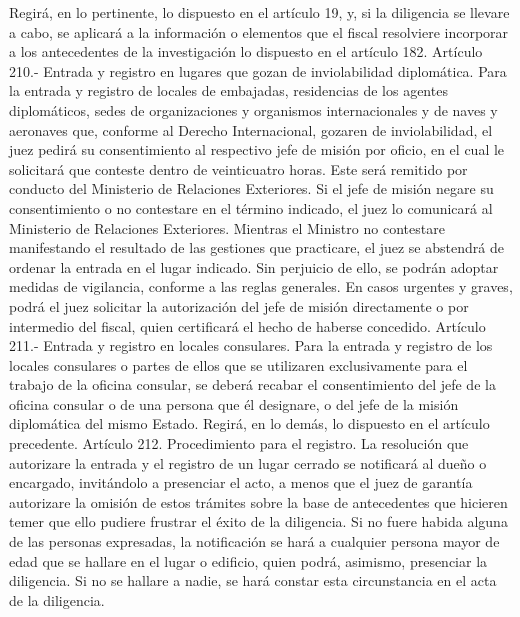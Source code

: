     Regirá, en lo pertinente, lo dispuesto en el artículo 19, y, si la diligencia se llevare a cabo, se aplicará a la información o elementos que el fiscal resolviere incorporar a los antecedentes de la investigación lo dispuesto en el artículo 182.
    Artículo 210.- Entrada y registro en lugares que gozan de inviolabilidad diplomática. Para la entrada y registro de locales de embajadas, residencias de los agentes diplomáticos, sedes de organizaciones y organismos internacionales y de naves y aeronaves que, conforme al Derecho Internacional, gozaren de inviolabilidad, el juez pedirá su consentimiento al respectivo jefe de misión por oficio, en el cual le solicitará que conteste dentro de veinticuatro horas. Este será remitido por conducto del Ministerio de Relaciones Exteriores.
    Si el jefe de misión negare su consentimiento o no contestare en el término indicado, el juez lo comunicará al Ministerio de Relaciones Exteriores. Mientras el Ministro no contestare manifestando el resultado de las gestiones que practicare, el juez se abstendrá de ordenar la entrada en el lugar indicado. Sin perjuicio de ello, se podrán adoptar medidas de vigilancia, conforme a las reglas generales.
    En casos urgentes y graves, podrá el juez solicitar la autorización del jefe de misión directamente o por intermedio del fiscal, quien certificará el hecho de haberse concedido.
    Artículo 211.- Entrada y registro en locales consulares. Para la entrada y registro de los locales consulares o partes de ellos que se utilizaren exclusivamente para el trabajo de la oficina consular, se deberá recabar el consentimiento del jefe de la oficina consular o de una persona que él designare, o del jefe de la misión diplomática del mismo Estado.
    Regirá, en lo demás, lo dispuesto en el artículo precedente.
    Artículo 212. Procedimiento para el registro. La resolución que autorizare la entrada y el registro de un lugar cerrado se notificará al dueño o encargado, invitándolo a presenciar el acto, a menos que el juez de garantía autorizare la omisión de estos trámites sobre la base de antecedentes que hicieren temer que ello pudiere frustrar el éxito de la diligencia.
    Si no fuere habida alguna de las personas expresadas, la notificación se hará a cualquier persona mayor de edad que se hallare en el lugar o edificio, quien podrá, asimismo, presenciar la diligencia.
    Si no se hallare a nadie, se hará constar esta circunstancia en el acta de la diligencia.

